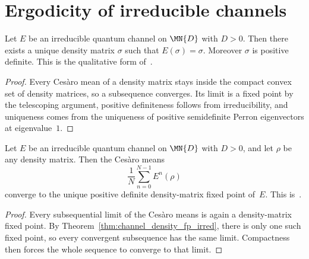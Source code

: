 \section{Ergodicity of irreducible channels}

\begin{theorem}
    \label{thm:channel_density_fp_irred}
    \leanok
    Let $E$ be an irreducible quantum channel on $\MN{D}$ with $D > 0$.
    Then there exists a unique density matrix $\sigma$ such that $E(\sigma) = \sigma$.
    Moreover $\sigma$ is positive definite.
    This is the qualitative form of~\cite[Corollary~6.3]{Wolf2012Quantum}.
\end{theorem}

\begin{proof}
    \leanok
    Every Ces\`aro mean of a density matrix stays inside the compact convex set
    of density matrices, so a subsequence converges.
    Its limit is a fixed point by the telescoping argument, positive
    definiteness follows from irreducibility, and uniqueness comes from the
    uniqueness of positive semidefinite Perron eigenvectors at eigenvalue~$1$.
\end{proof}

\begin{theorem}
    \label{thm:channel_cesaro_irred}
    \leanok
    Let $E$ be an irreducible quantum channel on $\MN{D}$ with $D > 0$,
    and let $\rho$ be any density matrix.
    Then the Ces\`aro means
    \[
        \frac{1}{N} \sum_{n=0}^{N-1} E^n(\rho)
    \]
    converge to the unique positive definite density-matrix fixed point of~$E$.
    This is~\cite[Corollary~6.3]{Wolf2012Quantum}.
\end{theorem}

\begin{proof}
    \leanok
    Every subsequential limit of the Ces\`aro means is again a density-matrix
    fixed point.
    By Theorem~\ref{thm:channel_density_fp_irred}, there is only one such
    fixed point, so every convergent subsequence has the same limit.
    Compactness then forces the whole sequence to converge to that limit.
\end{proof}

